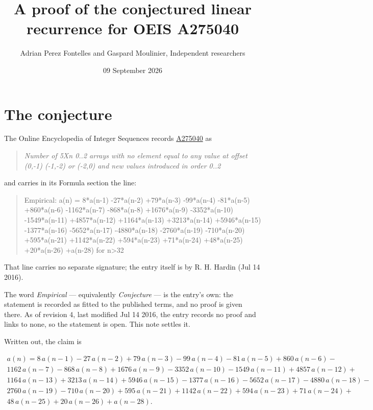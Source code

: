 \documentclass[11pt]{article}
\title{A proof of the conjectured linear recurrence for OEIS A275040}
\author{Adrian Perez Fontelles and Gaspard Moulinier, Independent researchers}
\date{09 September 2026}
\theoremstyle{definition}
\begin{document}
\maketitle
\section{The conjecture}

The Online Encyclopedia of Integer Sequences records \href{https://oeis.org/A275040}{A275040} as

\begin{quote}\itshape Number of 5Xn 0..2 arrays with no element equal to any value at offset (0,-1) (-1,-2) or (-2,0) and new values introduced in order 0..2\end{quote}

and carries in its Formula section the line:

\begin{quote}\ttfamily Empirical: a(n) = 8*a(n-1) -27*a(n-2) +79*a(n-3) -99*a(n-4) -81*a(n-5) +860*a(n-6) -1162*a(n-7) -868*a(n-8) +1676*a(n-9) -3352*a(n-10) -1549*a(n-11) +4857*a(n-12) +1164*a(n-13) +3213*a(n-14) +5946*a(n-15) -1377*a(n-16) -5652*a(n-17) -4880*a(n-18) -2760*a(n-19) -710*a(n-20) +595*a(n-21) +1142*a(n-22) +594*a(n-23) +71*a(n-24) +48*a(n-25) +20*a(n-26) +a(n-28) for n>32\end{quote}

That line carries no separate signature; the entry itself is by R. H. Hardin (Jul 14 2016).

The word {\itshape Empirical} --- equivalently {\itshape Conjecture} --- is the entry's own: the statement is recorded as fitted to the published terms, and no proof is given there. As of revision 4, last modified Jul 14 2016, the entry records no proof and links to none, so the statement is open. This note settles it.

Written out, the claim is

\begin{multline*} a(n) = 8\,a(n-1) - 27\,a(n-2) + 79\,a(n-3) - 99\,a(n-4) - 81\,a(n-5) + 860\,a(n-6) - \\ 1162\,a(n-7) - 868\,a(n-8) + 1676\,a(n-9) - 3352\,a(n-10) - 1549\,a(n-11) + 4857\,a(n-12) + \\ 1164\,a(n-13) + 3213\,a(n-14) + 5946\,a(n-15) - 1377\,a(n-16) - 5652\,a(n-17) - 4880\,a(n-18) - \\ 2760\,a(n-19) - 710\,a(n-20) + 595\,a(n-21) + 1142\,a(n-22) + 594\,a(n-23) + 71\,a(n-24) + \\ 48\,a(n-25) + 20\,a(n-26) + a(n-28). \end{multline*}
\end{document}
